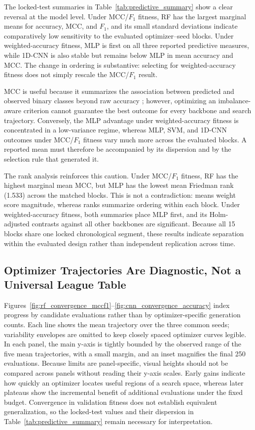 The locked-test summaries in Table~\ref{tab:predictive_summary} show a clear reversal at the model level. Under MCC/$F_1$ fitness, RF has the largest marginal means for accuracy, MCC, and $F_1$, and its small standard deviations indicate comparatively low sensitivity to the evaluated optimizer--seed blocks. Under weighted-accuracy fitness, MLP is first on all three reported predictive measures, while 1D-CNN is also stable but remains below MLP in mean accuracy and MCC. The change in ordering is substantive: selecting for weighted-accuracy fitness does not simply rescale the MCC/$F_1$ result.

MCC is useful because it summarizes the association between predicted and observed binary classes beyond raw accuracy \cite{chicco2020mcc}; however, optimizing an imbalance-aware criterion cannot guarantee the best outcome for every backbone and search trajectory. Conversely, the MLP advantage under weighted-accuracy fitness is concentrated in a low-variance regime, whereas MLP, SVM, and 1D-CNN outcomes under MCC/$F_1$ fitness vary much more across the evaluated blocks. A reported mean must therefore be accompanied by its dispersion and by the selection rule that generated it.

The rank analysis reinforces this caution. Under MCC/$F_1$ fitness, RF has the highest marginal mean MCC, but MLP has the lowest mean Friedman rank (1.533) across the matched blocks. This is not a contradiction: means weight score magnitude, whereas ranks summarize ordering within each block. Under weighted-accuracy fitness, both summaries place MLP first, and its Holm-adjusted contrasts against all other backbones are significant. Because all 15 blocks share one locked chronological segment, these results indicate separation within the evaluated design rather than independent replication across time.

\subsection{Optimizer Trajectories Are Diagnostic, Not a Universal League Table}

Figures~\ref{fig:rf_convergence_mccf1}--\ref{fig:cnn_convergence_accuracy} index progress by candidate evaluations rather than by optimizer-specific generation counts. Each line shows the mean trajectory over the three common seeds; variability envelopes are omitted to keep closely spaced optimizer curves legible. In each panel, the main y-axis is tightly bounded by the observed range of the five mean trajectories, with a small margin, and an inset magnifies the final 250 evaluations. Because limits are panel-specific, visual heights should not be compared across panels without reading their y-axis scales. Early gains indicate how quickly an optimizer locates useful regions of a search space, whereas later plateaus show the incremental benefit of additional evaluations under the fixed budget. Convergence in validation fitness does not establish equivalent generalization, so the locked-test values and their dispersion in Table~\ref{tab:predictive_summary} remain necessary for interpretation.

